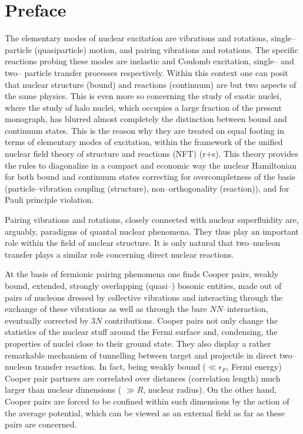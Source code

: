 
 \chapter*{Preface}
The elementary modes of nuclear excitation are vibrations and rotations, single--particle (quasiparticle)  motion, and pairing vibrations and rotations. The specific reactions probing these modes are inelastic and Coulomb excitation,  single-- and two-- particle transfer processes respectively. Within this context one can posit that nuclear structure (bound) and reactions (continuum) are but two aspects of the same physics. This is even more so concerning the study of exotic nuclei, where the study of halo nuclei, which occupies a large fraction of the present monograph, has blurred almost completely the distinction between bound and continuum states. This is the reason why they are treated on equal footing in terms of elementary modes of excitation, within the framework of the unified nuclear field theory of structure and reactions (NFT) (r+s). This theory provides the rules to diagonalize in a compact and economic way the nuclear Hamiltonian for both bound and continuum states correcting for overcompletness of the basis (particle--vibration coupling (structure), non--orthogonality (reaction)), and for Pauli principle violation. 

Pairing vibrations and rotations, closely connected with nuclear superfluidity are, arguably,  paradigms of quantal nuclear phenomena. They thus play an important  role within the field of nuclear structure. It is only natural that two--nucleon transfer plays a similar role concerning direct nuclear reactions. 


At the basis of fermionic pairing phenomena one finds Cooper pairs, weakly bound, extended, strongly overlapping (quasi--) bosonic entities, made out of pairs of nucleons dressed by collective vibrations and interacting through the exchange of these vibrations as well as through the bare $NN$--interaction, eventually corrected by $3N$ contributions.
Cooper pairs not only change the statistics of the nuclear stuff around the Fermi surface and, condensing, the properties of nuclei close to their ground state. They also display a rather remarkable mechanism of tunnelling between  target and projectile in  direct two--nucleon transfer reaction. In fact, being weakly bound ($\ll \epsilon_F$, Fermi energy) Cooper pair partners are correlated over distances (correlation length) much larger than nuclear dimensions ( $\gg R$, nuclear radius). On the other hand, Cooper pairs are forced to be confined within such dimensions by the action of the average potential, which can be viewed as an external field as far as these pairs are concerned.


